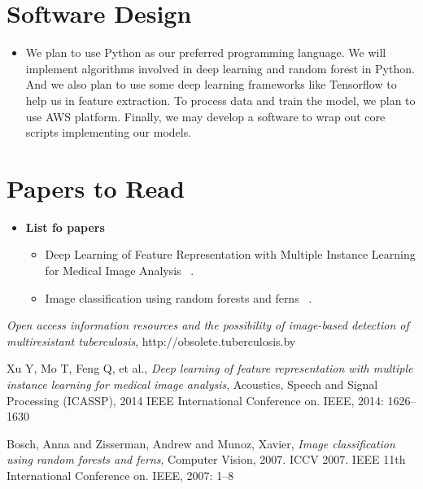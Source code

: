 \documentclass[letterpaper, 11pt]{article}
\begin{document}
\section{Software Design}
\begin{itemize}
\item
We plan to use Python as our preferred programming language. We will implement algorithms involved in deep learning and random forest in Python. And we also plan to use some deep learning frameworks like Tensorflow to help us in feature extraction. To process data and train the model, we plan to use AWS platform. Finally, we may develop a software to wrap out core scripts implementing our models.
\end{itemize}


\section{Papers to Read}
\begin{itemize}
\item
	\textbf{List fo papers}
	
	\begin{itemize}
	\item
		Deep Learning of Feature Representation with Multiple Instance Learning for Medical Image Analysis
		~\cite{DepplearningFeatureRepresentation}.
		
	\item
		Image classification using random forests and ferns
		~\cite{RandomForestImageClassification}.
	\end{itemize}
\end{itemize}


\begin{thebibliography}{1}
\textit{Open access information resources and the possibility of image-based detection of multiresistant tuberculosis}, http://obsolete.tuberculosis.by

Xu Y, Mo T, Feng Q, et al., \textit{Deep learning of feature representation with multiple instance learning for medical image analysis}, Acoustics, Speech and Signal Processing (ICASSP), 2014 IEEE International Conference on. IEEE, 2014: 1626--1630

Bosch, Anna and Zisserman, Andrew and Munoz, Xavier, \textit{Image classification using random forests and ferns}, Computer Vision, 2007. ICCV 2007. IEEE 11th International Conference on. IEEE, 2007: 1--8
\end{thebibliography}
\end{document}
